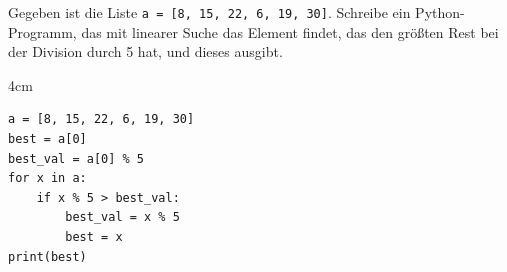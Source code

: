 \question[4]
Gegeben ist die Liste \texttt{a = [8, 15, 22, 6, 19, 30]}. Schreibe ein Python-Programm, 
das mit linearer Suche das Element findet, das den größten Rest bei der Division durch 5 hat, 
und dieses ausgibt.

\begin{solutionbox}{4cm}
\begin{lstlisting}
a = [8, 15, 22, 6, 19, 30]
best = a[0]
best_val = a[0] % 5
for x in a:
    if x % 5 > best_val:
        best_val = x % 5
        best = x
print(best)
\end{lstlisting}
\end{solutionbox}